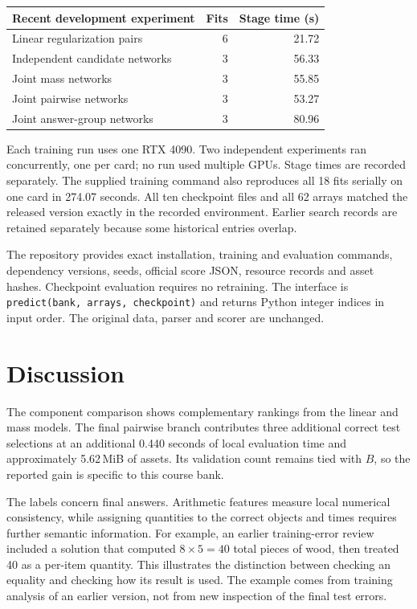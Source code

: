 \documentclass[11pt,a4paper]{article}
\begin{document}
\begin{center}
\small
\begin{tabularx}{\linewidth}{Yrr}
\toprule
Recent development experiment & Fits & Stage time (s) \\
\midrule
Linear regularization pairs & 6 & 21.72 \\
Independent candidate networks & 3 & 56.33 \\
Joint mass networks & 3 & 55.85 \\
Joint pairwise networks & 3 & 53.27 \\
Joint answer-group networks & 3 & 80.96 \\
\bottomrule
\end{tabularx}
\end{center}

Each training run uses one RTX 4090. Two independent experiments ran concurrently, one per card; no run used multiple GPUs. Stage times are recorded separately. The supplied training command also reproduces all 18 fits serially on one card in 274.07 seconds. All ten checkpoint files and all 62 arrays matched the released version exactly in the recorded environment. Earlier search records are retained separately because some historical entries overlap.

The repository provides exact installation, training and evaluation commands, dependency versions, seeds, official score JSON, resource records and asset hashes. Checkpoint evaluation requires no retraining. The interface is \texttt{predict(bank, arrays, checkpoint)} and returns Python integer indices in input order. The original data, parser and scorer are unchanged.

\clearpage
\section{Discussion}

The component comparison shows complementary rankings from the linear and mass models. The final pairwise branch contributes three additional correct test selections at an additional 0.440 seconds of local evaluation time and approximately 5.62\,MiB of assets. Its validation count remains tied with $B$, so the reported gain is specific to this course bank.

The labels concern final answers. Arithmetic features measure local numerical consistency, while assigning quantities to the correct objects and times requires further semantic information. For example, an earlier training-error review included a solution that computed $8\times5=40$ total pieces of wood, then treated 40 as a per-item quantity. This illustrates the distinction between checking an equality and checking how its result is used. The example comes from training analysis of an earlier version, not from new inspection of the final test errors.
\end{document}
